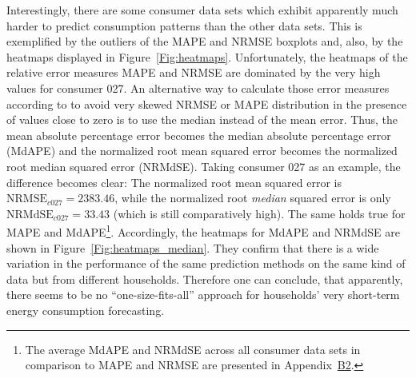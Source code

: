Interestingly, there are some consumer data sets which exhibit apparently much harder to predict consumption patterns than the other data sets. This is exemplified by the outliers of the MAPE and NRMSE boxplots and, also, by the heatmaps displayed in Figure~\ref{Fig:heatmaps}. Unfortunately, the heatmaps of the relative error measures MAPE and NRMSE are dominated by the very high values for consumer 027. An alternative way to calculate those error measures according to \citet{Hyndman:2006} to avoid very skewed NRMSE or MAPE distribution in the presence of values close to zero is to use the median instead of the mean error. Thus, the mean absolute percentage error becomes the median absolute percentage error (MdAPE) and the normalized root mean squared error becomes the normalized root median squared error (NRMdSE). Taking consumer 027 as an example, the difference becomes clear: The normalized root mean squared error is $\text{NRMSE}_{c027}=2383.46$, while the normalized root \emph{median} squared error is only $\text{NRMdSE}_{c027}=33.43$ (which is still comparatively high). The same holds true for MAPE and MdAPE\footnote{The average MdAPE and NRMdSE across all consumer data sets in comparison to MAPE and NRMSE are presented in Appendix~\hyperlink{AppB2:Tables:avg_errM_wMedian}{B2}.}. Accordingly, the heatmaps for MdAPE and NRMdSE are shown in Figure~\ref{Fig:heatmaps_median}. They confirm that there is a wide variation in the performance of the same prediction methods on the same kind of data but from different households. Therefore one can conclude, that apparently, there seems to be no ``one-size-fits-all'' approach for households' very short-term energy consumption forecasting.

